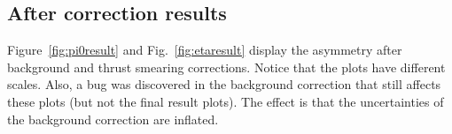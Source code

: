 \subsection{After correction results}
Figure~\ref{fig:pi0result} and Fig.~\ref{fig:etaresult} display the asymmetry after background and thrust smearing corrections. Notice that the plots have different scales. 
Also, a bug was discovered in the background correction that still affects these plots (but not the final result plots). The effect is that the uncertainties of the background correction are inflated.
\begin{figure}[H]
  \centering     

\end{figure}
